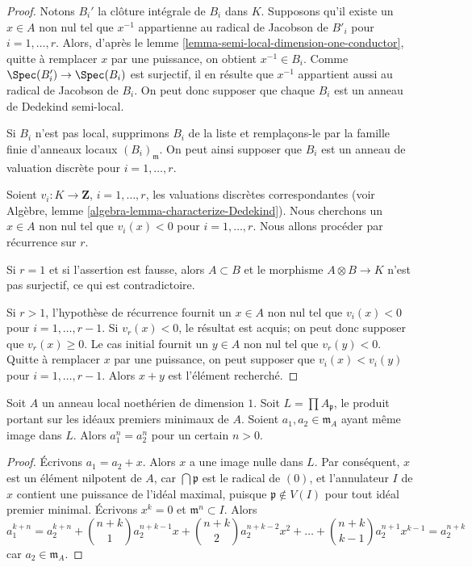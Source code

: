 \begin{proof}
Notons $B_i'$ la clôture intégrale de $B_i$ dans $K$. Supposons qu'il existe un
$x \in A$ non nul tel que $x^{-1}$ appartienne au radical de Jacobson de $B'_i$ pour
$i = 1, \ldots, r$. Alors, d'après le
lemme \ref{lemma-semi-local-dimension-one-conductor},
quitte à remplacer $x$ par une puissance, on obtient $x^{-1} \in B_i$.
Comme $\Spec(B'_i) \to \Spec(B_i)$ est surjectif, il en résulte que
$x^{-1}$ appartient aussi au radical de Jacobson de $B_i$.
On peut donc supposer que chaque $B_i$ est un anneau de Dedekind semi-local.

\medskip\noindent
Si $B_i$ n'est pas local, supprimons $B_i$ de la liste et
remplaçons-le par la famille finie d'anneaux locaux $(B_i)_\mathfrak m$.
On peut ainsi supposer que $B_i$ est un anneau de valuation discrète pour
$i = 1, \ldots, r$.

\medskip\noindent
Soient $v_i : K \to \mathbf{Z}$, $i = 1, \ldots, r$,
les valuations discrètes correspondantes (voir
Algèbre, lemme \ref{algebra-lemma-characterize-Dedekind}).
Nous cherchons un $x \in A$ non nul tel que $v_i(x) < 0$ pour
$i = 1, \ldots, r$. Nous allons procéder par récurrence sur $r$.

\medskip\noindent
Si $r = 1$ et si l'assertion est fausse, alors $A \subset B$ et le morphisme
$A \otimes B \to K$ n'est pas surjectif, ce qui est contradictoire.

\medskip\noindent
Si $r > 1$, l'hypothèse de récurrence fournit un $x \in A$ non nul tel que
$v_i(x) < 0$ pour $i = 1, \ldots, r - 1$. Si $v_r(x) < 0$, le résultat est
acquis; on peut donc supposer que $v_r(x) \geq 0$. Le cas initial fournit un
$y \in A$ non nul tel que $v_r(y) < 0$. Quitte à remplacer $x$ par une
puissance, on peut supposer que $v_i(x) < v_i(y)$ pour $i = 1, \ldots, r - 1$.
Alors $x + y$ est l'élément recherché.
\end{proof}

\begin{lemma}
\label{lemma-power-equal}
Soit $A$ un anneau local noethérien de dimension $1$.
Soit $L = \prod A_\mathfrak p$, le produit portant sur
les idéaux premiers minimaux de $A$. Soient $a_1, a_2 \in \mathfrak m_A$
ayant même image dans $L$. Alors $a_1^n = a_2^n$ pour
un certain $n > 0$.
\end{lemma}

\begin{proof}
Écrivons $a_1 = a_2 + x$. Alors $x$ a une image nulle dans $L$. Par conséquent,
$x$ est un élément nilpotent de $A$, car $\bigcap \mathfrak p$
est le radical de $(0)$, et l'annulateur $I$ de $x$ contient
une puissance de l'idéal maximal, puisque $\mathfrak p \not \in V(I)$
pour tout idéal premier minimal. Écrivons $x^k = 0$ et $\mathfrak m^n \subset I$.
Alors
$$
a_1^{k + n} = a_2^{k + n} + {n + k \choose 1} a_2^{n + k - 1} x +
{n + k \choose 2} a_2^{n + k - 2} x^2 + \ldots +
{n + k \choose k - 1} a_2^{n + 1} x^{k - 1} = a_2^{n + k}
$$
car $a_2 \in \mathfrak m_A$.
\end{proof}

